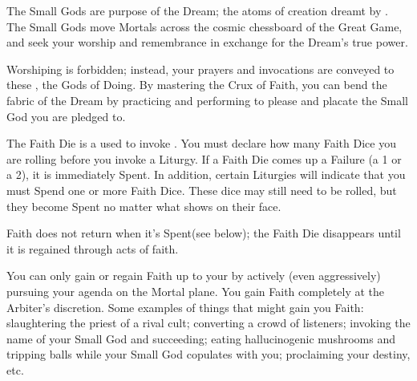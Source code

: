 

The Small Gods are purpose of the Dream; the atoms of creation dreamt by \TheAuthority. The Small Gods move Mortals across the cosmic chessboard of the Great Game, and seek your worship and remembrance in exchange for the Dream's true power. 

Worshiping \TheAuthority is forbidden; instead, your prayers and invocations are conveyed to these , the Gods of Doing.  By mastering the Crux of Faith, you can bend the fabric of the Dream by practicing  and performing  to please and placate the Small God you are pledged to.





The Faith Die is a  used to invoke . You must declare how many Faith Dice you are rolling before you invoke a Liturgy. If a Faith Die comes up a Failure (a 1 or a 2), it is immediately Spent.  In addition, certain Liturgies will indicate that you must Spend one or more Faith Dice. These dice may still need to be rolled, but they become Spent no matter what shows on their face.

Faith does not return when it's Spent(see  below); the Faith Die disappears until it is regained through acts of faith.  

\cbreak


    You can only gain or regain Faith up to your \MAX by actively (even aggressively) pursuing your  agenda on the Mortal plane.  You gain Faith completely at the Arbiter's discretion.  Some examples of things that might gain you Faith: slaughtering the priest of a rival cult; converting a crowd of listeners; invoking the name of your Small God and succeeding; eating hallucinogenic mushrooms and tripping balls while your Small God copulates with you; proclaiming your destiny, etc.

